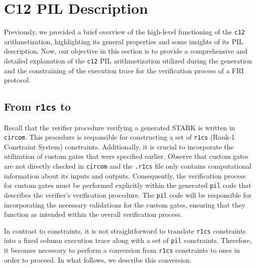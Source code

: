 


\section{C12 PIL Description} \label{sec:c12}

Previously, we provided a brief overview of the high-level functioning of the \texttt{c12} arithmetization, highlighting its general properties and some insights of its PIL description. Now, our objective in this section is to provide a comprehensive and detailed explanation of the \texttt{c12} PIL arithmetization utilized during the generation and the constraining of the execution trace for the verification process of a FRI protocol.

\subsection{From \texttt{r1cs} to \plonk}

Recall that the verifier procedure verifying a generated STARK is written in \texttt{circom}. This procedure is responsible for constructing a set of \texttt{r1cs} (Rank-1 Constraint System) constraints.  Additionally, it is crucial to incorporate the utilization of custom gates that were specified earlier. Observe that custom gates are not directly checked in \texttt{circom} and the \texttt{.r1cs} file only contains computational information about its inputs and outputs. Consequently, the verification process for custom gates must be performed explicitly within the generated \texttt{pil} code that describes the verifier's verification procedure. The \texttt{pil} code will be responsible for incorporating the necessary validations for the custom gates, ensuring that they function as intended within the overall verification process. 

In contrast to \plonk constraints, it is not straightforward to translate \texttt{r1cs} constraints into a fixed column execution trace along with a set of \texttt{pil} constraints. Therefore, it becomes necessary to perform a conversion from \texttt{r1cs} constraints to \plonk ones in order to proceed. In what follows, we describe this conversion. 

